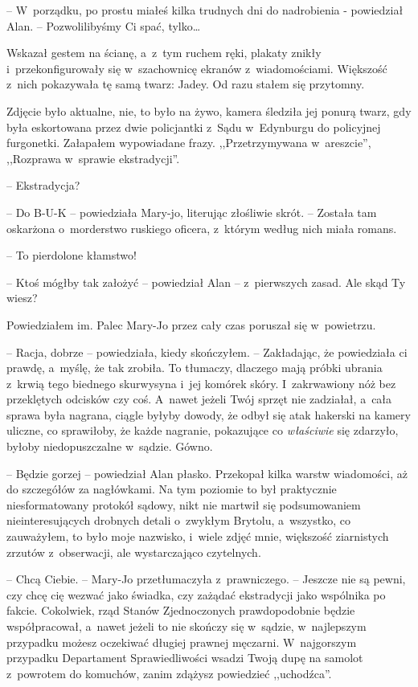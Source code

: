 \documentclass[oneside,polish,12pt,sfheadings]{mwbk}
\begin{document}
-- W~porządku, po prostu miałeś kilka trudnych dni do nadrobienia -
powiedział Alan. -- Pozwolilibyśmy Ci spać, tylko\ldots

Wskazał gestem na ścianę, a~z~tym ruchem ręki, plakaty znikły i~przekonfigurowały się w~szachownicę ekranów z~wiadomościami. Większość z~nich pokazywała tę samą twarz: Jadey. Od razu stałem się przytomny.

Zdjęcie było aktualne, nie, to było na żywo, kamera śledziła jej ponurą
twarz, gdy była eskortowana przez dwie policjantki z~Sądu w~Edynburgu do
policyjnej furgonetki. Załapałem wypowiadane frazy. ,,Przetrzymywana w~areszcie'', ,,Rozprawa w~sprawie ekstradycji''.

-- Ekstradycja?

-- Do B-U-K -- powiedziała Mary-jo, literując złośliwie skrót. -- Została
tam oskarżona o~morderstwo ruskiego oficera, z~którym według nich miała
romans.

-- To pierdolone kłamstwo!

-- Ktoś mógłby tak założyć -- powiedział Alan -- z~pierwszych zasad. Ale
skąd Ty wiesz?

Powiedziałem im. Palec Mary-Jo przez cały czas poruszał się w~powietrzu.

-- Racja, dobrze -- powiedziała, kiedy skończyłem. -- Zakładając, że
powiedziała ci prawdę, a~myślę, że tak zrobiła. To tłumaczy, dlaczego
mają próbki ubrania z~krwią tego biednego skurwysyna i~jej komórek
skóry. I~zakrwawiony nóż bez przeklętych odcisków czy coś. A~nawet
jeżeli Twój sprzęt nie zadziałał, a~cała sprawa była nagrana, ciągle
byłyby dowody, że odbył się atak hakerski na kamery uliczne, co
sprawiłoby, że każde nagranie, pokazujące co \emph{właściwie} się
zdarzyło, byłoby niedopuszczalne w~sądzie. Gówno.

-- Będzie gorzej -- powiedział Alan płasko. Przekopał kilka warstw
wiadomości, aż do szczegółów za nagłówkami. Na tym poziomie to był
praktycznie niesformatowany protokół sądowy, nikt nie martwił się
podsumowaniem nieinteresujących drobnych detali o~zwykłym Brytolu, a~wszystko, co zauważyłem, to było moje nazwisko, i~wiele zdjęć mnie,
większość ziarnistych zrzutów z~obserwacji, ale wystarczająco
czytelnych.

-- Chcą Ciebie. -- Mary-Jo przetłumaczyła z~prawniczego. -- Jeszcze nie są
pewni, czy chcę cię wezwać jako świadka, czy zażądać ekstradycji jako
wspólnika po fakcie. Cokolwiek, rząd Stanów Zjednoczonych prawdopodobnie
będzie współpracował, a~nawet jeżeli to nie skończy się w~sądzie, w~najlepszym przypadku możesz oczekiwać długiej prawnej męczarni. W~najgorszym przypadku Departament Sprawiedliwości wsadzi Twoją dupę na
samolot z~powrotem do komuchów, zanim zdążysz powiedzieć ,,uchodźca''.
\end{document}
